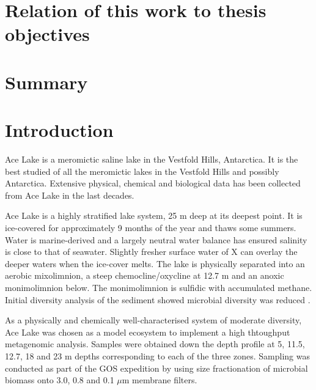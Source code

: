 \section*{Relation of this work to thesis objectives}

\section{Summary}



\section{Introduction}
Ace Lake is a meromictic saline lake in the Vestfold Hills, Antarctica. 
It is the best studied of all the meromictic lakes in the Vestfold Hills and possibly Antarctica.
Extensive physical, chemical and biological data has been collected from Ace Lake in the last decades.

Ace Lake is a highly stratified lake system, 25 m deep at its deepest point.
It is ice-covered for approximately 9 months of the year and thaws some summers. %
Water is marine-derived and a largely neutral water balance has ensured salinity is close to that of seawater.
Slightly fresher surface water of X can overlay the deeper waters when the ice-cover melts.
The lake is physically separated into an aerobic mixolimnion, a steep chemocline/oxycline at 12.7 m and an anoxic monimolimnion below.
The monimolimnion is sulfidic with accumulated methane.
Initial diversity analysis of the sediment showed microbial diversity was reduced \cite{Bowman2000a}.

As a physically and chemically well-characterised system of moderate diversity, Ace Lake was chosen as a model ecosystem to implement a high thtoughput metagenomic analysis.
Samples were obtained down the depth profile at 5, 11.5, 12.7, 18 and 23 m depths corresponding to each of the three zones.
Sampling was conducted as part of the \ac{GOS} expedition \cite{Rusch2007} by using size fractionation of microbial biomass onto 3.0, 0.8 and 0.1 $\mu$m membrane filters.

